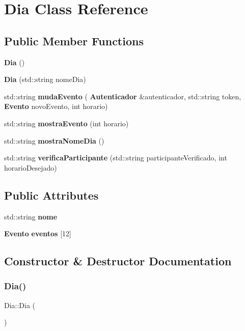 \section{Dia Class Reference}
\label{class_dia}
\subsection*{Public Member Functions}
\begin{DoxyCompactItemize}
\item 
\textbf{ Dia} ()
\item 
\textbf{ Dia} (std\+::string nome\+Dia)
\item 
std\+::string \textbf{ muda\+Evento} (\textbf{ Autenticador} \&autenticador, std\+::string token, \textbf{ Evento} novo\+Evento, int horario)
\item 
std\+::string \textbf{ mostra\+Evento} (int horario)
\item 
std\+::string \textbf{ mostra\+Nome\+Dia} ()
\item 
std\+::string \textbf{ verifica\+Participante} (std\+::string participante\+Verificado, int horario\+Desejado)
\end{DoxyCompactItemize}
\subsection*{Public Attributes}
\begin{DoxyCompactItemize}
\item 
std\+::string \textbf{ nome}
\item 
\textbf{ Evento} \textbf{ eventos} [12]
\end{DoxyCompactItemize}


\subsection{Constructor \& Destructor Documentation}
\mbox{\label{class_dia_ad3d7dd80a96ed581b56b5eaa7277bb35}} 
\subsubsection{Dia()\hspace{0.1cm}{\footnotesize\ttfamily [1/2]}}
{\footnotesize\ttfamily Dia\+::\+Dia (\begin{DoxyParamCaption}{ }\end{DoxyParamCaption})\hspace{0.3cm}{\ttfamily [inline]}}

